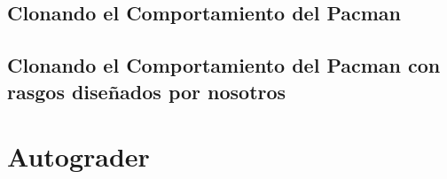 \documentclass{report}
\begin{document}
        \subsection{Clonando el Comportamiento del Pacman}
        \subsection{Clonando el Comportamiento del Pacman con rasgos diseñados por nosotros}
      \section{Autograder}
        \begin{lstlisting}[language=Python, caption=Ejecución del autograder]
          
        \end{lstlisting}
\end{document}

